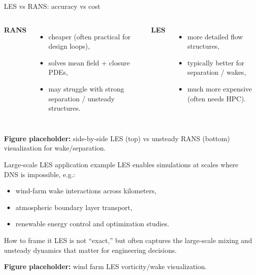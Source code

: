 \documentclass[aspectratio=169]{beamer}
\begin{document}
\begin{frame}{LES vs RANS: accuracy vs cost}
\begin{columns}[T,onlytextwidth]
\textbf{RANS}
\begin{itemize}
  \item cheaper (often practical for design loops),
  \item solves mean field + closure PDEs,
  \item may struggle with strong separation / unsteady structures.
\end{itemize}

\textbf{LES}
\begin{itemize}
  \item more detailed flow structures,
  \item typically better for separation / wakes,
  \item much more expensive (often needs HPC).
\end{itemize}
\end{columns}

\vspace{0.8em}
\textbf{Figure placeholder:} side-by-side LES (top) vs unsteady RANS (bottom) visualization for wake/separation.
\end{frame}

\begin{frame}{Large-scale LES application example}
LES enables simulations at scales where DNS is impossible, e.g.:
\begin{itemize}
  \item wind-farm wake interactions across kilometers,
  \item atmospheric boundary layer transport,
  \item renewable energy control and optimization studies.
\end{itemize}

\begin{block}{How to frame it}
LES is not ``exact,'' but often captures the large-scale mixing and unsteady dynamics that matter for engineering decisions.
\end{block}

\textbf{Figure placeholder:} wind farm LES vorticity/wake visualization.
\end{frame}
\end{document}
